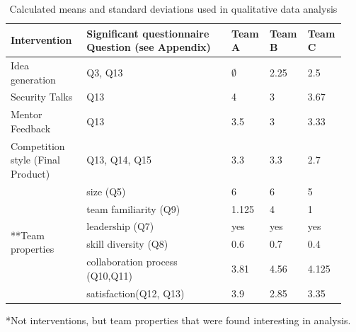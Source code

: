 \documentclass[runningheads]{llncs}
\begin{document}
\begin{table}[h]
    \caption{Calculated means and standard deviations used in qualitative data analysis}
    \label{tab:teambinter}
    \begin{tabular}{|p{0.22\linewidth}|p{0.42\linewidth}|p{0.1\linewidth}|p{0.1\linewidth}|p{0.1\linewidth}|}\hline
	Intervention & Significant \newline questionnaire Question (see Appendix) &  Team A & Team B & Team C \\ \hline
	Idea generation & Q3, Q13 & $\emptyset$ & 2.25 & 2.5  \\ \hline
	Security Talks  & Q13 &  4 & 3 & 3.67   \\ \hline
	Mentor Feedback  & Q13 &  3.5 & 3 & 3.33 \\ \hline
	Competition style \newline (Final Product) & Q13, Q14, Q15 & 3.3 & 3.3 & 2.7   \\ \hline
	\multirow{8}{*}{**Team properties} & size (Q5) & 6 & 6 & 5  \\\cline{2-5}
	& team familiarity (Q9) & 1.125 & 4 & 1  \\ \cline{2-5}
	& leadership (Q7) & yes & yes & yes  \\ \cline{2-5}
	& skill diversity (Q8) & 0.6 & 0.7 & 0.4  \\ \cline{2-5}
	& collaboration process (Q10,Q11) & 3.81 & 4.56 & 4.125  \\ \cline{2-5}
	& satisfaction(Q12, Q13) & 3.9 & 2.85 & 3.35  \\ \hline
    \end{tabular}
    *Not interventions, but team properties that were found interesting in analysis.
\end{table}
\end{document}
